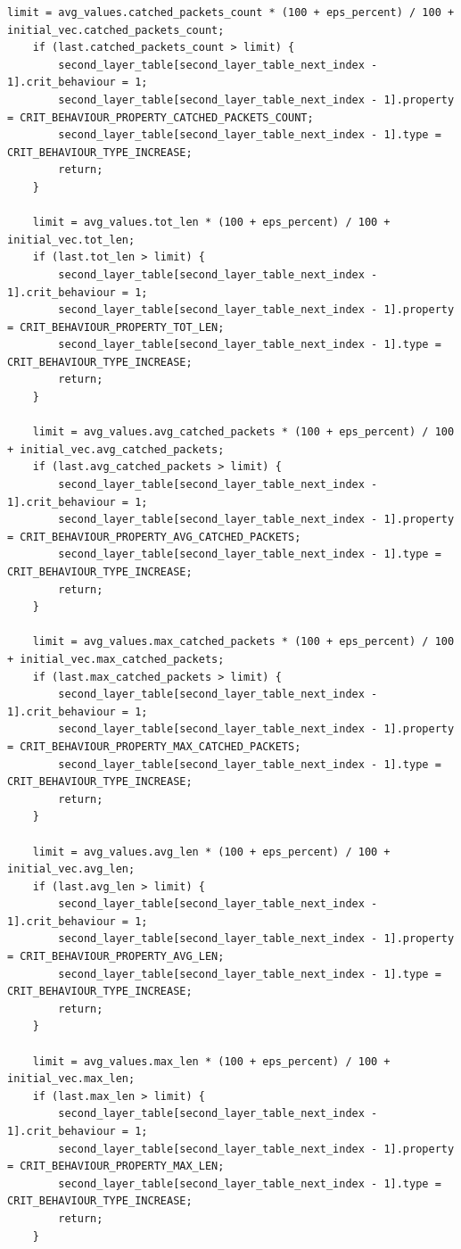 \documentclass{bmstu}
\begin{document}
\begin{lstlisting}[caption = {core\_module.c}]
    limit = avg_values.catched_packets_count * (100 + eps_percent) / 100 + initial_vec.catched_packets_count;
    if (last.catched_packets_count > limit) {
        second_layer_table[second_layer_table_next_index - 1].crit_behaviour = 1;
        second_layer_table[second_layer_table_next_index - 1].property = CRIT_BEHAVIOUR_PROPERTY_CATCHED_PACKETS_COUNT;
        second_layer_table[second_layer_table_next_index - 1].type = CRIT_BEHAVIOUR_TYPE_INCREASE;
        return;
    }

    limit = avg_values.tot_len * (100 + eps_percent) / 100 + initial_vec.tot_len;
    if (last.tot_len > limit) {
        second_layer_table[second_layer_table_next_index - 1].crit_behaviour = 1;
        second_layer_table[second_layer_table_next_index - 1].property = CRIT_BEHAVIOUR_PROPERTY_TOT_LEN;
        second_layer_table[second_layer_table_next_index - 1].type = CRIT_BEHAVIOUR_TYPE_INCREASE;
        return;
    }

    limit = avg_values.avg_catched_packets * (100 + eps_percent) / 100 + initial_vec.avg_catched_packets;
    if (last.avg_catched_packets > limit) {
        second_layer_table[second_layer_table_next_index - 1].crit_behaviour = 1;
        second_layer_table[second_layer_table_next_index - 1].property = CRIT_BEHAVIOUR_PROPERTY_AVG_CATCHED_PACKETS;
        second_layer_table[second_layer_table_next_index - 1].type = CRIT_BEHAVIOUR_TYPE_INCREASE;
        return;
    }

    limit = avg_values.max_catched_packets * (100 + eps_percent) / 100 + initial_vec.max_catched_packets;
    if (last.max_catched_packets > limit) {
        second_layer_table[second_layer_table_next_index - 1].crit_behaviour = 1;
        second_layer_table[second_layer_table_next_index - 1].property = CRIT_BEHAVIOUR_PROPERTY_MAX_CATCHED_PACKETS;
        second_layer_table[second_layer_table_next_index - 1].type = CRIT_BEHAVIOUR_TYPE_INCREASE;
        return;
    }

    limit = avg_values.avg_len * (100 + eps_percent) / 100 + initial_vec.avg_len;
    if (last.avg_len > limit) {
        second_layer_table[second_layer_table_next_index - 1].crit_behaviour = 1;
        second_layer_table[second_layer_table_next_index - 1].property = CRIT_BEHAVIOUR_PROPERTY_AVG_LEN;
        second_layer_table[second_layer_table_next_index - 1].type = CRIT_BEHAVIOUR_TYPE_INCREASE;
        return;
    }

    limit = avg_values.max_len * (100 + eps_percent) / 100 + initial_vec.max_len;
    if (last.max_len > limit) {
        second_layer_table[second_layer_table_next_index - 1].crit_behaviour = 1;
        second_layer_table[second_layer_table_next_index - 1].property = CRIT_BEHAVIOUR_PROPERTY_MAX_LEN;
        second_layer_table[second_layer_table_next_index - 1].type = CRIT_BEHAVIOUR_TYPE_INCREASE;
        return;
    }


\end{lstlisting}
\end{document}
